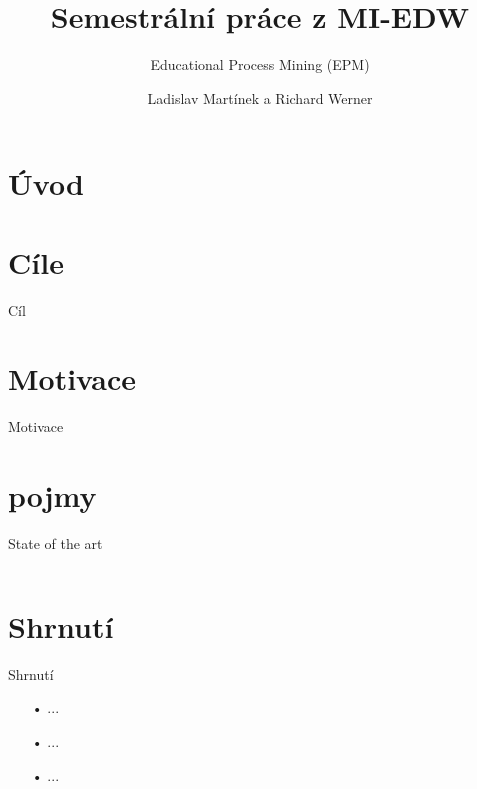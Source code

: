 \documentclass[aspectratio=169,28pt]{beamer}
\title{Semestrální práce z MI-EDW}
\subtitle{Educational Process Mining (EPM)}
\author{Ladislav Martínek a Richard Werner}
\date {}
\begin{document}
\section{Úvod}
\begin{frame}
\titlepage
\end{frame}

\section{Cíle}
\begin{frame}{Cíl}
       
\end{frame}

\section{Motivace}
\begin{frame}{Motivace}
		
\end{frame}


\section{pojmy}
\begin{frame}{State of the art}

\begin{columns}[c]
    \column{5cm}
    
    \column{10cm}
 \end{columns}   
		
\end{frame}

\section{Shrnutí}
\begin{frame}{Shrnutí}
		\begin{itemize}
		\item[•] ...
		\item[•] ...
		\item[•] ...
		\end{itemize}
\end{frame}


\end{document}
